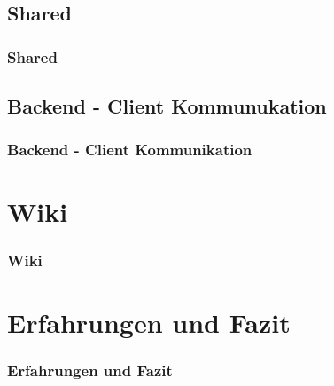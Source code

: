 \documentclass{beamer}
\begin{document}
\subsection{Shared}
\begin{frame}
\frametitle{Shared}
\end{frame}

\subsection{Backend - Client Kommunukation}
\begin{frame}
\frametitle{Backend - Client Kommunikation}
\end{frame}

\section{Wiki}
\begin{frame}
\frametitle{Wiki}

\end{frame}

\section{Erfahrungen und Fazit}
\begin{frame}
\frametitle{Erfahrungen und Fazit}

\end{frame}
\end{document}
